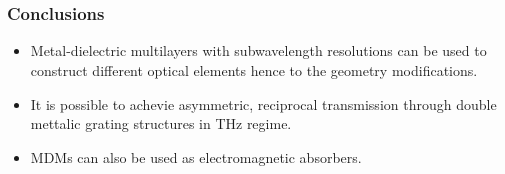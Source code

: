 \documentclass{beamer}
\begin{document}
\section{}

\begin{frame}
	\frametitle{Conclusions}

	\begin{itemize}
		\item Metal-dielectric multilayers with subwavelength resolutions can be used to construct different optical elements hence to the geometry modifications.
		\item It is possible to achevie asymmetric, reciprocal transmission through double mettalic grating structures in THz regime.
		\item MDMs can also be used as electromagnetic absorbers. 
	\end{itemize}

\end{frame}

%		
\end{document}
